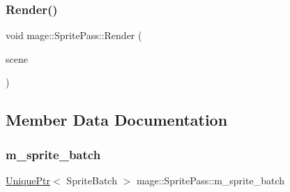 \hypertarget{classmage_1_1_sprite_pass_ad617d46a3edbf5ee533f4d20e3d69ae2}{}\label{classmage_1_1_sprite_pass_ad617d46a3edbf5ee533f4d20e3d69ae2} 
\subsubsection{\texorpdfstring{Render()}{Render()}}
{\footnotesize\ttfamily void mage\+::\+Sprite\+Pass\+::\+Render (\begin{DoxyParamCaption}\item[{const \hyperlink{structmage_1_1_pass_buffer}{Pass\+Buffer} $\ast$}]{scene }\end{DoxyParamCaption})}



\subsection{Member Data Documentation}
\hypertarget{classmage_1_1_sprite_pass_a9083152ae0681429df4dd0fce533f7dc}{}\label{classmage_1_1_sprite_pass_a9083152ae0681429df4dd0fce533f7dc} 
\subsubsection{\texorpdfstring{m\+\_\+sprite\+\_\+batch}{m\_sprite\_batch}}
{\footnotesize\ttfamily \hyperlink{namespacemage_a3316d7143a973e37adf1110f2e80ca31}{Unique\+Ptr}$<$ Sprite\+Batch $>$ mage\+::\+Sprite\+Pass\+::m\+\_\+sprite\+\_\+batch\hspace{0.3cm}{\ttfamily [private]}}

